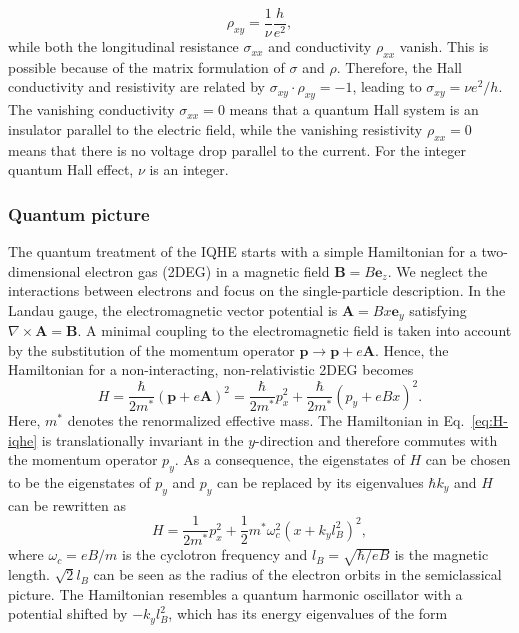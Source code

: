 \begin{equation}
\rho_{xy} = \frac{1}{\nu} \frac{h}{e^2},
\label{eq:hallres}
\end{equation}
while both the longitudinal resistance $\sigma_{xx}$ and conductivity $\rho_{xx}$ vanish. This is possible because of the matrix formulation of $\sigma$ and $\rho$. Therefore, the Hall conductivity and resistivity are related by $\sigma_{xy} \cdot \rho_{xy} = -1$, leading to $\sigma_{xy} = \nu e^2 /h$. The vanishing conductivity $\sigma_{xx}= 0$ means that a quantum Hall system is an insulator parallel to the electric field, while the vanishing resistivity $\rho_{xx} = 0$ means that there is no voltage drop parallel to the current. For the integer quantum Hall effect, $\nu$ is an integer. 

\subsubsection{Quantum picture}
The quantum treatment of the IQHE starts with a simple Hamiltonian for a two-dimensional electron gas (2DEG) in a magnetic field $\mathbf{B} = B \mathbf{e}_z$. We neglect the interactions between electrons and focus on the single-particle description. In the Landau gauge, the electromagnetic vector potential is $\mathbf{A} = Bx \mathbf{e}_y$ satisfying $\nabla \times \mathbf{A} = \mathbf{B}$. A minimal coupling to the electromagnetic field is taken into account by the substitution of the momentum operator $ \mathbf{p} \rightarrow  \mathbf{p}  + e \mathbf{A} $. Hence, the Hamiltonian for a non-interacting, non-relativistic 2DEG becomes
\begin{equation}
H = \frac{\hbar}{2 m^*} ( \mathbf{p}  + e \mathbf{A} )^2 = \frac{\hbar}{2m^*} p_x^2 + \frac{\hbar}{2m^*} (p_y +  eBx)^2.
\label{eq:H-iqhe}
\end{equation}
Here, $m^*$ denotes the renormalized effective mass. The Hamiltonian in Eq.~\eqref{eq:H-iqhe} is translationally invariant in the $y$-direction and therefore commutes with the momentum operator $p_y$. As a consequence, the eigenstates of $H$ can be chosen to be the eigenstates of $p_y$ and $p_y$ can be replaced by its eigenvalues $\hbar k_y$ and $H$ can be rewritten as
\begin{equation}
H = \frac{1}{2m^*} p_x^2 + \frac{1}{2} m^* \omega_c^2 ( x + k_y l_B^2)^2,
\end{equation}
where $\omega_c = eB/m$ is the cyclotron frequency and $l_B = \sqrt{ \hbar / eB}$ is the magnetic length. $\sqrt{2} l_B$ can be seen as the radius of the electron orbits in the semiclassical picture. The Hamiltonian resembles a quantum harmonic oscillator with a potential shifted by $-k_y l_B^2$, which has its energy eigenvalues of the form 
